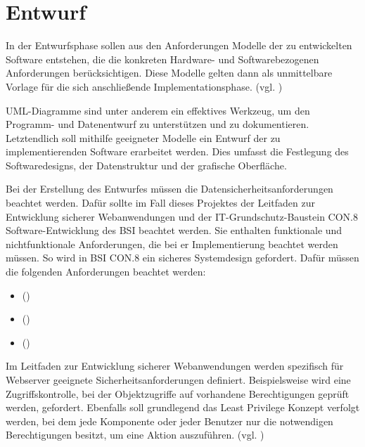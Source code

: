 \section{Entwurf}
\label{sec:Entwurf}
In der Entwurfsphase sollen aus den Anforderungen Modelle der zu entwickelten Software entstehen, die die konkreten Hardware- und Softwarebezogenen Anforderungen berücksichtigen. Diese Modelle gelten dann als unmittelbare Vorlage für die sich anschließende Implementationsphase. (vgl. \cite[S. 69]{dumke-2003})

UML-Diagramme sind unter anderem ein effektives Werkzeug, um den Programm- und Datenentwurf zu unterstützen und zu dokumentieren. Letztendlich soll mithilfe geeigneter Modelle ein Entwurf der zu implementierenden Software erarbeitet werden. Dies umfasst die Festlegung des Softwaredesigns, der Datenstruktur und der grafische Oberfläche.

Bei der Erstellung des Entwurfes müssen die Datensicherheitsanforderungen beachtet werden. Dafür sollte im Fall dieses Projektes der Leitfaden zur Entwicklung sicherer Webanwendungen und der IT-Grundschutz-Baustein CON.8 Software-Entwicklung des BSI beachtet werden. Sie enthalten funktionale und nichtfunktionale Anforderungen, die bei er Implementierung beachtet werden müssen. So wird in BSI CON.8 ein sicheres Systemdesign gefordert. Dafür müssen \ua die folgenden Anforderungen beachtet werden:
\begin{itemize}
    \item  {} (\cite[S.5]{BSICON8})
    \item  {} (\cite[S.5]{BSICON8})
    \item  {} (\cite[S.5]{BSICON8})
\end{itemize}

Im Leitfaden zur Entwicklung sicherer Webanwendungen werden spezifisch für Webserver geeignete Sicherheitsanforderungen definiert. Beispielsweise wird eine Zugriffskontrolle, bei der Objektzugriffe auf vorhandene Berechtigungen geprüft werden, gefordert. Ebenfalls soll grundlegend das Least Privilege Konzept verfolgt werden, bei dem jede Komponente oder jeder Benutzer nur die notwendigen Berechtigungen besitzt, um eine Aktion auszuführen. (vgl. \cite{BSIWeb})



